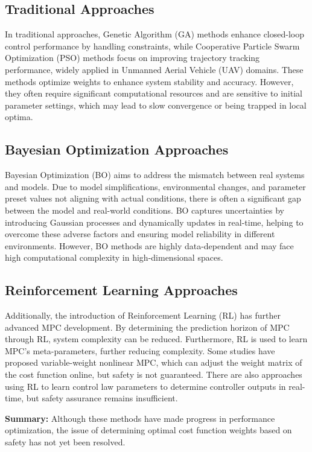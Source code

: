 \documentclass[9pt,a4paper,twocolumn,twoside]{tau-class/tau}
\begin{document}
\subsection{Traditional Approaches}
In traditional approaches, Genetic Algorithm (GA) methods enhance closed-loop control performance by handling constraints, while Cooperative Particle Swarm Optimization (PSO) methods focus on improving trajectory tracking performance, widely applied in Unmanned Aerial Vehicle (UAV) domains. These methods optimize weights to enhance system stability and accuracy. However, they often require significant computational resources and are sensitive to initial parameter settings, which may lead to slow convergence or being trapped in local optima.
\subsection{Bayesian Optimization Approaches}
Bayesian Optimization (BO) aims to address the mismatch between real systems and models. Due to model simplifications, environmental changes, and parameter preset values not aligning with actual conditions, there is often a significant gap between the model and real-world conditions. BO captures uncertainties by introducing Gaussian processes and dynamically updates in real-time, helping to overcome these adverse factors and ensuring model reliability in different environments. However, BO methods are highly data-dependent and may face high computational complexity in high-dimensional spaces.
\subsection{Reinforcement Learning Approaches}
Additionally, the introduction of Reinforcement Learning (RL) has further advanced MPC development. By determining the prediction horizon of MPC through RL, system complexity can be reduced. Furthermore, RL is used to learn MPC's meta-parameters, further reducing complexity. Some studies have proposed variable-weight nonlinear MPC, which can adjust the weight matrix of the cost function online, but safety is not guaranteed. There are also approaches using RL to learn control law parameters to determine controller outputs in real-time, but safety assurance remains insufficient.

\textbf{Summary:} Although these methods have made progress in performance optimization, the issue of determining optimal cost function weights based on safety has not yet been resolved.
\end{document}
